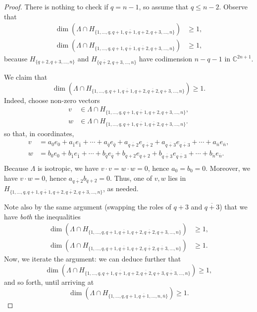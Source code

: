 \documentclass[12pt]{amsart}
\newcommand{\bC}{\mathbb{C}}
\begin{document}
\begin{proof}
There is nothing to check if $q=n-1$, so assume that $q\le n-2$. Observe that
\begin{align*}
    \dim(\Lambda\cap H_{\{1,\ldots,q,q+1,\overline{q+1},q+2,q+3,\ldots,n\}})&\ge 1, \\
    \dim(\Lambda\cap H_{\{1,\ldots,q,q+1,\overline{q+1},\overline{q+2},q+3,\ldots,n\}})&\ge 1,
\end{align*}
because $H_{\{q+2,q+3,\ldots,n\}}$ and $H_{\{\overline{q+2},q+3,\ldots,n\}}$ have codimension $n-q-1$ in $\bC^{2n+1}$. 

We claim that
    \begin{equation*}
    \dim(\Lambda\cap H_{\{1,\ldots,q,q+1,\overline{q+1},q+2,\overline{q+2},q+3,\ldots,n\}})\ge 1.
    \end{equation*}
Indeed, choose non-zero vectors
\begin{align*}
        v&\in \Lambda\cap H_{\{1,\ldots,q,q+1,\overline{q+1},q+2,q+3,\ldots,n\}}, \\
        w&\in \Lambda\cap H_{\{1,\ldots,q,q+1,\overline{q+1},\overline{q+2},q+3,\ldots,n\}}.
\end{align*}
so that, in coordinates,
\begin{align*}
v&=a_0e_0+a_{\bar1}e_{\bar1}+\cdots+a_{\overline{q}}e_{\overline{q}}+a_{\overline{q+2}}e_{\overline{q+2}}+a_{\overline{q+3}}e_{\overline{q+3}}+\cdots+a_{\overline{n}}e_{\overline{n}},\\
w&=b_0e_0+b_{\bar1}e_{\bar1}+\cdots+b_{\overline{q}}e_{\overline{q}}+b_{q+2}e_{q+2}+b_{\overline{q+3}}e_{\overline{q+3}}+\cdots+b_{\overline{n}}e_{\overline{n}}.\\
\end{align*}
Because $\Lambda$ is isotropic, we have $v\cdot v=w\cdot w=0$, hence $a_0=b_0=0$. Moreover, we have $v\cdot w=0$, hence $a_{\overline{q+2}}b_{q+2}=0$. Thus, one of $v,w$ lies in $H_{\{1,\ldots,q,q+1,\overline{q+1},q+2,\overline{q+2},q+3,\ldots,n\}}$, as needed.

Note also by the same argument (swapping the roles of $q+3$ and $\overline{q+3}$) that we have \emph{both} the inequalities
    \begin{align*}
    \dim(\Lambda\cap H_{\{1,\ldots,q,q+1,\overline{q+1},q+2,\overline{q+2},q+3,\ldots,n\}})&\ge 1,\\
    \dim(\Lambda\cap H_{\{1,\ldots,q,q+1,\overline{q+1},q+2,\overline{q+2},\overline{q+3},\ldots,n\}})&\ge 1.
    \end{align*}
Now, we iterate the argument: we can deduce further that
    \begin{equation*}
    \dim(\Lambda\cap H_{\{1,\ldots,q,q+1,\overline{q+1},q+2,\overline{q+2},q+3,\overline{q+3},\ldots,n\}})\ge 1,
    \end{equation*}
and so forth, until arriving at
    \begin{equation*}
    \dim(\Lambda\cap H_{\{1,\ldots,q,q+1,\overline{q+1},\ldots,n,\overline{n}\}})\ge 1.
    \end{equation*}


\end{proof}
\end{document}
